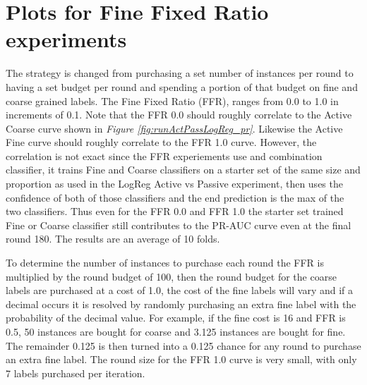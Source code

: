 \documentclass[ms]{nuthesis}
\begin{document}
%


\clearpage

\section{Plots for Fine Fixed Ratio experiments}
\par The strategy is changed from purchasing a set number of instances
    per round to having a set budget per round and spending a portion of that budget
    on fine and coarse grained labels. The Fine Fixed Ratio (FFR), ranges from 0.0 to
    1.0 in increments of 0.1. Note that the FFR 0.0 should roughly correlate to the
    Active Coarse curve shown in \textit{Figure \ref{fig:runActPassLogReg_pr}}. Likewise
    the Active Fine curve should roughly correlate to the FFR 1.0 curve. However, the correlation
    is not exact since the FFR experiements use and combination classifier, it trains Fine and
    Coarse classifiers on a starter set of the same size and proportion as used in the
    LogReg Active vs Passive experiment, then uses the confidence of both of those classifiers and
    the end prediction is the max of the two classifiers. Thus even for the FFR 0.0 and FFR 1.0
    the starter set trained Fine or Coarse classifier still contributes to the PR-AUC curve
    even at the final round 180. The results are an average of 10 folds.

    \par To determine the number of instances to purchase each round the FFR is multiplied by the
    round budget of 100, then the round budget for the coarse labels are purchased at a cost of 1.0,
    the cost of the fine labels will vary and if a decimal occurs it is resolved by randomly purchasing
    an extra fine label with the probability of the decimal value. For example, if the fine cost is 16 and
    FFR is 0.5, 50 instances are bought for coarse and 3.125 instances are
    bought for fine. The remainder 0.125 is then turned into a 0.125 chance for any round to
    purchase an extra fine label. The round size for the FFR 1.0 curve is very small, with only
    7 labels purchased per iteration.
\end{document}

